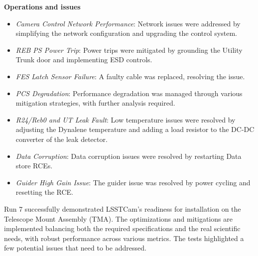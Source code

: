 \textbf{Operations and issues} \\
\begin{itemize}
    \item \textit{Camera Control Network Performance}: Network issues were addressed by simplifying the network configuration and upgrading the control system.
    \item \textit{REB PS Power Trip}: Power trips were mitigated by grounding the Utility Trunk door and implementing ESD controls.
    \item \textit{FES Latch Sensor Failure}: A faulty cable was replaced, resolving the issue.
    \item \textit{PCS Degradation}: Performance degradation was managed through various mitigation strategies, with further analysis required.
    \item \textit{R24/Reb0 and UT Leak Fault}: Low temperature issues were resolved by adjusting the Dynalene temperature and adding a load resistor to the DC-DC converter of the leak detector.
    \item \textit{Data Corruption}: Data corruption issues were resolved by restarting Data store RCEs.
    \item \textit{Guider High Gain Issue}: The guider issue was resolved by power cycling and resetting the RCE.
\end{itemize}

Run 7 successfully demonstrated LSSTCam's readiness for installation on the Telescope Mount Assembly (TMA). The optimizations and mitigations are implemented balancing both the required specifications and the real scientific needs, with robust performance across various metrics. The tests highlighted a few potential issues that need to be addressed.

\clearpage
